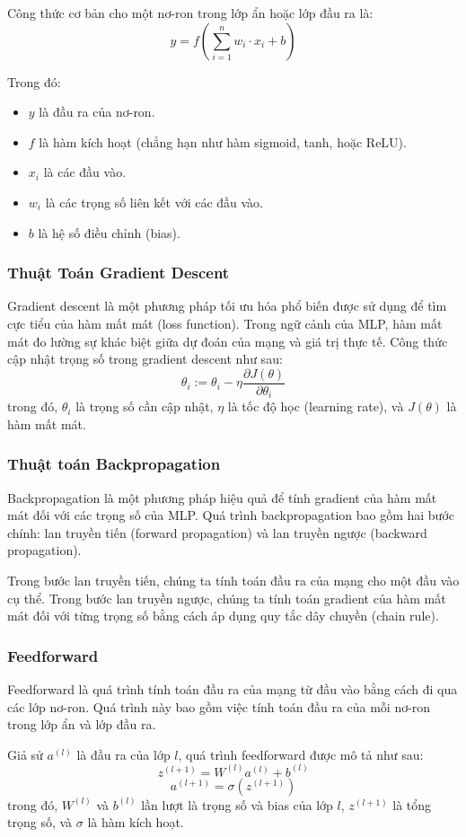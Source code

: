 Công thức cơ bản cho một nơ-ron trong lớp ẩn hoặc lớp đầu ra là:
\[
y = f\left( \sum_{i=1}^{n} w_i \cdot x_i + b \right)
\]

Trong đó:
\begin{itemize}
    \item \( y \) là đầu ra của nơ-ron.
    \item \( f \) là hàm kích hoạt (chẳng hạn như hàm sigmoid, tanh, hoặc ReLU).
    \item \( x_i \) là các đầu vào.
    \item \( w_i \) là các trọng số liên kết với các đầu vào.
    \item \( b \) là hệ số điều chỉnh (bias).
\end{itemize}

\subsubsection{Thuật Toán Gradient Descent}

Gradient descent là một phương pháp tối ưu hóa phổ biến được sử dụng để tìm cực tiểu của hàm mất mát (loss function). Trong ngữ cảnh của MLP, hàm mất mát đo lường sự khác biệt giữa dự đoán của mạng và giá trị thực tế.
Công thức cập nhật trọng số trong gradient descent như sau:
\[
\theta_{i} := \theta_{i} - \eta \frac{\partial J(\theta)}{\partial \theta_{i}}
\]
trong đó, \(\theta_{i}\) là trọng số cần cập nhật, \(\eta\) là tốc độ học (learning rate), và \(J(\theta)\) là hàm mất mát.

\subsubsection{Thuật toán Backpropagation}

Backpropagation là một phương pháp hiệu quả để tính gradient của hàm mất mát đối với các trọng số của MLP. Quá trình backpropagation bao gồm hai bước chính: lan truyền tiến (forward propagation) và lan truyền ngược (backward propagation).

Trong bước lan truyền tiến, chúng ta tính toán đầu ra của mạng cho một đầu vào cụ thể. Trong bước lan truyền ngược, chúng ta tính toán gradient của hàm mất mát đối với từng trọng số bằng cách áp dụng quy tắc dây chuyền (chain rule).

\subsubsection{Feedforward}

Feedforward là quá trình tính toán đầu ra của mạng từ đầu vào bằng cách đi qua các lớp nơ-ron. Quá trình này bao gồm việc tính toán đầu ra của mỗi nơ-ron trong lớp ẩn và lớp đầu ra.

Giả sử \(a^{(l)}\) là đầu ra của lớp \(l\), quá trình feedforward được mô tả như sau:
\[
z^{(l+1)} = W^{(l)}a^{(l)} + b^{(l)}
\]
\[
a^{(l+1)} = \sigma(z^{(l+1)})
\]
trong đó, \(W^{(l)}\) và \(b^{(l)}\) lần lượt là trọng số và bias của lớp \(l\), \(z^{(l+1)}\) là tổng trọng số, và \(\sigma\) là hàm kích hoạt.